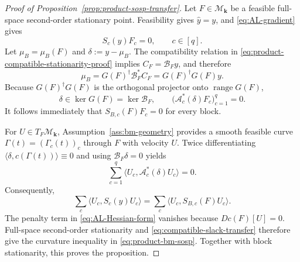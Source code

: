 \documentclass[11pt]{article}
\theoremstyle{definition}
\theoremstyle{remark}
\begin{document}
\begin{proof}[Proof of Proposition~\ref{prop:product-sosp-transfer}]
Let $F\in\mathcal M_{\mathbf k}$ be a feasible full-space second-order
stationary point.  Feasibility gives $\widehat y=y$, and
\eqref{eq:AL-gradient} gives
\begin{equation}
  S_c(y)F_c=0,\qquad c\in[q].
  \label{eq:product-compatible-stationarity-proof}
\end{equation}
Let $\mu_B=\mu_B(F)$ and $\delta:=y-\mu_B$.  The compatibility relation in
\eqref{eq:product-compatible-stationarity-proof} implies
$C_F=\mathcal B_Fy$, and therefore
\[
  \mu_B
  =G(F)^\dagger\mathcal B_F^*C_F
  =G(F)^\dagger G(F)y.
\]
Because $G(F)^\dagger G(F)$ is the orthogonal projector onto
$\operatorname{range}G(F)$,
\[
  \delta\in\ker G(F)=\ker\mathcal B_F,
  \qquad
  \bigl(\mathcal A_c^*(\delta)F_c\bigr)_{c=1}^q=0.
\]
It follows immediately that $S_{B,c}(F)F_c=0$ for every block.

For $U\in T_F\mathcal M_{\mathbf k}$, Assumption~\ref{ass:bm-geometry}
provides a smooth feasible curve
$\Gamma(t)=(\Gamma_c(t))_c$ through $F$ with velocity $U$.  Twice
differentiating
$\langle\delta,c(\Gamma(t))\rangle\equiv0$ and using
$\mathcal B_F\delta=0$ yields
\[
  \sum_{c=1}^q
  \langle U_c,\mathcal A_c^*(\delta)U_c\rangle=0.
\]
Consequently,
\begin{equation}
  \sum_c\langle U_c,S_c(y)U_c\rangle
  =
  \sum_c\langle U_c,S_{B,c}(F)U_c\rangle.
  \label{eq:compatible-slack-transfer}
\end{equation}
The penalty term in \eqref{eq:AL-Hessian-form} vanishes because
$Dc(F)[U]=0$.  Full-space second-order stationarity and
\eqref{eq:compatible-slack-transfer} therefore give the curvature inequality
in \eqref{eq:product-bm-sosp}.  Together with block stationarity, this proves
the proposition.
\end{proof}
\end{document}
